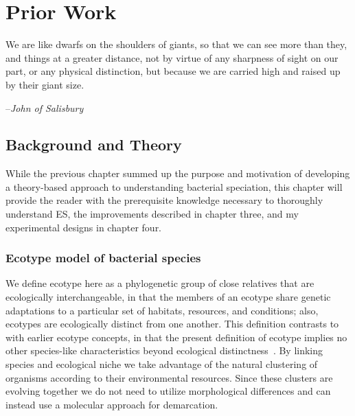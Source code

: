\gobbletocpage
\chapter{Prior Work}
\restoretocpage


\begin{shadequote}
We are like dwarfs on the shoulders of giants, so that we can see more than they, and things at a greater distance, not by virtue of any sharpness of sight on our part, or any physical distinction, but because we are carried high and raised up by their giant size.\par--\emph{John of Salisbury}
\end{shadequote}

\section{Background and Theory}
While the previous chapter summed up the purpose and motivation of developing a theory-based approach to understanding bacterial speciation, this chapter will provide the reader with the prerequisite knowledge necessary to thoroughly understand ES, the improvements described in chapter three, and my experimental designs in chapter four.

\subsection*{Ecotype model of bacterial species}
We define ecotype here as a phylogenetic group of close relatives that are ecologically interchangeable, in that the members of an ecotype share genetic adaptations to a particular set of habitats, resources, and conditions; also, ecotypes are ecologically distinct from one another.
This definition contrasts to with earlier ecotype concepts, in that the present definition of ecotype implies no other species-like characteristics beyond ecological distinctness~\cite{wiedenbeckHGT}.
By linking species and ecological niche we take advantage of the natural clustering of organisms according to their environmental resources.
Since these clusters are evolving together we do not need to utilize morphological differences and can instead use a molecular approach for demarcation.

